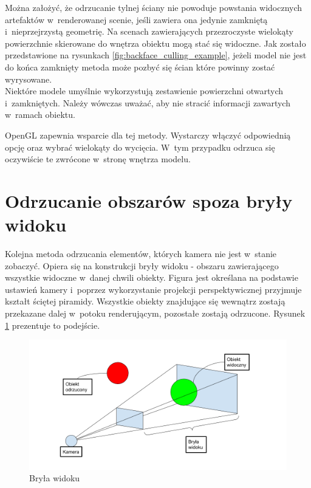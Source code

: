\documentclass[a4paper,twoside,12pt]{book}
\begin{document}
Można założyć, że odrzucanie tylnej ściany nie powoduje powstania widocznych artefaktów w~renderowanej scenie, jeśli zawiera ona jedynie zamkniętą i~nieprzejrzystą geometrię. Na scenach zawierających przezroczyste wielokąty powierzchnie skierowane do wnętrza obiektu mogą stać się widoczne. Jak zostało przedstawione na rysunkach \ref{fig:backface_culling_example}, jeżeli model nie jest do końca zamknięty metoda może pozbyć się ścian które powinny zostać wyrysowane. \\
Niektóre modele umyślnie wykorzystują zestawienie powierzchni otwartych i~zamkniętych. Należy wówczas uważać, aby nie stracić informacji zawartych w~ramach obiektu.

OpenGL zapewnia wsparcie dla tej metody. Wystarczy włączyć odpowiednią opcję oraz wybrać wielokąty do wycięcia. W~tym przypadku odrzuca się oczywiście te zwrócone w~stronę wnętrza modelu.



\section{Odrzucanie obszarów spoza bryły widoku}
Kolejna metoda odrzucania elementów, których kamera nie jest w~stanie zobaczyć. Opiera się na konstrukcji bryły widoku - obszaru zawierającego wszystkie widoczne w~danej chwili obiekty. Figura jest określana na podstawie ustawień kamery i~poprzez wykorzystanie projekcji perspektywicznej przyjmuje kształt ściętej piramidy. Wszystkie obiekty znajdujące się wewnątrz zostają przekazane dalej w~potoku renderującym, pozostałe zostają odrzucone. Rysunek \ref{fig:frustrum_view} prezentuje to podejście.

\begin{figure}[H]
    \centering
    \includegraphics[width=\textwidth]{res/frustrum_view.png}
    \caption{Bryła widoku}
    \label{fig:frustrum_view}
\end{figure}
\end{document}
